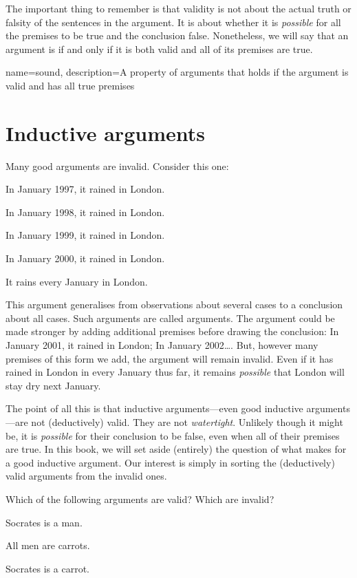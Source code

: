 The important thing to remember is that validity is not about the actual truth or falsity of the sentences in the argument. It is about whether it is \emph{possible} for all the premises to be true and the conclusion false. Nonetheless, we will say that an argument is  if and only if it is both valid and all of its premises are true.

{
name=sound,
description={A property of arguments that holds if the argument is valid and has all true premises}
}

\section{Inductive arguments}
Many good arguments are invalid. Consider this one:
	\begin{earg}
		\item[] In January 1997, it rained in London.
		\item[] In January 1998, it rained in London.
		\item[] In January 1999, it rained in London.
		\item[] In January 2000, it rained in London.
	\item[\therefore] It rains every January in London.
\end{earg}
This argument generalises from observations about several cases to a conclusion about all cases. Such arguments are called  arguments. The argument could be made stronger by adding additional premises before drawing the conclusion: In January 2001, it rained in London; In January 2002\ldots. But, however many premises of this form we add, the argument will remain invalid. Even if it has rained in London in every January thus far, it remains \emph{possible} that London will stay dry next January.

The point of all this is that inductive arguments---even good inductive arguments---are not (deductively) valid. They are not \emph{watertight}. Unlikely though it might be, it is \emph{possible} for their conclusion to be false, even when all of their premises are true. In this book, we will set aside (entirely) the question of what makes for a good inductive argument. Our interest is simply in sorting the (deductively) valid arguments from the invalid ones.  

\practiceproblems
\problempart
Which of the following arguments are valid? Which are invalid?

\begin{earg}
\item Socrates is a man.
\item All men are carrots.
\item[\therefore] Socrates is a carrot.
\end{earg}

